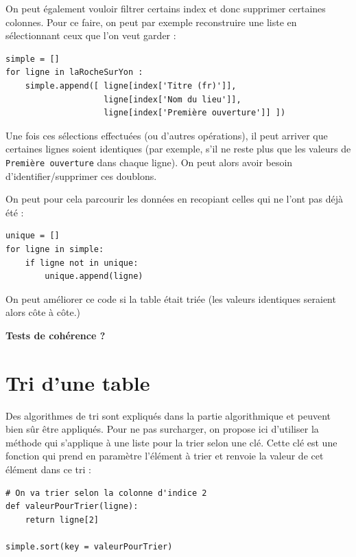 {\medskip

On peut également vouloir filtrer certains index et donc supprimer certaines colonnes. Pour ce faire, on peut par exemple reconstruire une liste en sélectionnant ceux que l'on veut garder :

\begin{verbatim}
simple = []
for ligne in laRocheSurYon :
    simple.append([ ligne[index['Titre (fr)']],
                    ligne[index['Nom du lieu']],
                    ligne[index['Première ouverture']] ])
\end{verbatim}

Une fois ces sélections effectuées (ou d'autres opérations), il peut arriver que certaines lignes soient identiques (par exemple, s'il ne reste plus que les valeurs de \texttt{Première ouverture} dans chaque ligne). On peut alors avoir besoin d'identifier/supprimer ces doublons.

On peut pour cela parcourir les données en recopiant celles qui ne l'ont pas déjà été :

\begin{verbatim}
unique = []
for ligne in simple:
    if ligne not in unique:
        unique.append(ligne)
\end{verbatim}

On peut améliorer ce code si la table était triée (les valeurs identiques seraient alors côte à côte.)


{\color{rouge}\bfseries Tests de cohérence ?}

\section{Tri d'une table}

Des algorithmes de tri sont expliqués dans la partie algorithmique et peuvent bien sûr être appliqués. Pour ne pas surcharger, on propose ici d'utiliser la méthode  qui s'applique à une liste pour la trier selon une clé. Cette clé est une fonction qui prend en paramètre l'élément à trier et renvoie la valeur de cet élément dans ce tri :

\begin{verbatim}
# On va trier selon la colonne d'indice 2
def valeurPourTrier(ligne):
    return ligne[2]

simple.sort(key = valeurPourTrier)
\end{verbatim}

}
